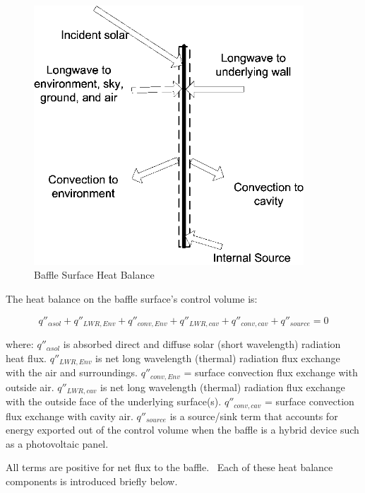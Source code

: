 \begin{figure}[hbtp] %
\centering
\includegraphics[width=0.9\textwidth, height=0.9\textheight, keepaspectratio=true]{media/image438.png}
\caption{Baffle Surface Heat Balance \protect \label{fig:baffle-surface-heat-balance}}
\end{figure}

The heat balance on the baffle surface's control volume is:

\begin{equation}
{q''_{\alpha sol}} + {q''_{LWR,Env}} + {q''_{conv,Env}} + {q''_{LWR,cav}} + {q''_{conv,cav}} + {q''_{source}} = 0
\end{equation}

where: 
\(q''_{\alpha sol}\) is absorbed direct and diffuse solar (short wavelength) radiation heat flux.
\(q''_{LWR,Env}\) is net long wavelength (thermal) radiation flux exchange with the air and surroundings.
\(q''_{conv,Env}\) = surface convection flux exchange with outside air.
\(q''_{LWR,cav}\) is net long wavelength (thermal) radiation flux exchange with the outside face of the underlying surface(s).
\(q''_{conv,cav}\) = surface convection flux exchange with cavity air.
\({q''_{source}}\) is a source/sink term that accounts for energy exported out of the control volume when the baffle is a hybrid device such as a photovoltaic panel.

All terms are positive for net flux to the baffle.~ Each of these heat balance components is introduced briefly below.

